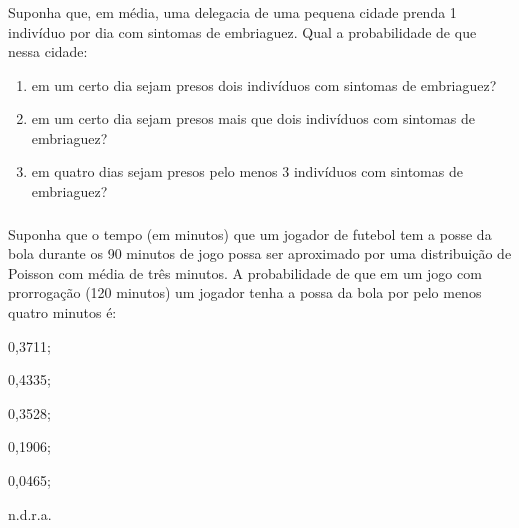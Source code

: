 \documentclass[14pt,aspectratio=1610]{beamer}
\begin{document}
\begin{frame}{}
\frametitle{}
\begin{block}{}
\justifying
Suponha que, em média, uma delegacia de uma pequena cidade prenda 1 indivíduo por dia com sintomas de embriaguez. Qual a probabilidade de que nessa cidade:
\begin{enumerate}
\item\label{examp:Poi3a} em um certo dia sejam presos dois indivíduos com sintomas de embriaguez?
\item\label{examp:Poi3b} em um certo dia sejam presos mais que dois indivíduos com sintomas de embriaguez?
\item\label{examp:Poi3c} em quatro dias sejam presos pelo menos 3 indivíduos com sintomas de embriaguez?
\end{enumerate}
\end{block}
\end{frame}

\begin{frame}{}
\frametitle{}
\begin{block}{}
\justifying
Suponha que o tempo (em minutos) que um jogador de futebol tem a posse da bola durante os 90 minutos de jogo possa ser aproximado por uma distribui\c{c}\~{a}o de Poisson com m\'{e}dia de tr\^{e}s minutos. A probabilidade de que em um jogo com prorroga\c{c}\~{a}o (120 minutos) um jogador tenha a possa da bola por pelo menos quatro minutos \'{e}:
\begin{enumerate}
\begin{multicols}{3}
\item 0,3711;
\item 0,4335;
\item 0,3528;
\item 0,1906;
\item 0,0465;
\item\label{corr03} n.d.r.a.
\end{multicols}
\end{enumerate}
\end{block}
\end{frame}
\end{document}
